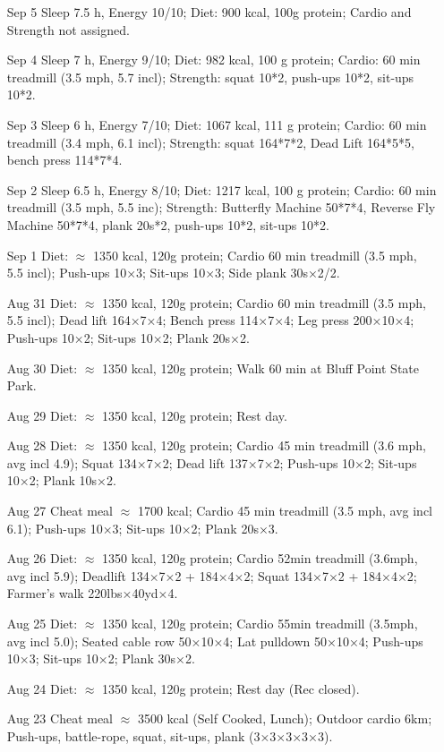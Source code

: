 \documentclass{article}
\begin{document}
\begin{itemize}
\item [Sep 5] Sleep 7.5 h, Energy 10/10; Diet:  900 kcal, 100g protein; Cardio and Strength not assigned.
\item [Sep 4] Sleep 7 h, Energy 9/10; Diet: 982 kcal, 100 g protein; Cardio: 60 min treadmill (3.5 mph, 5.7 incl); Strength: squat 10*2, push-ups 10*2, sit-ups 10*2.
\item [Sep 3] Sleep 6 h, Energy 7/10; Diet: 1067 kcal, 111 g protein; Cardio: 60 min treadmill (3.4 mph, 6.1 incl); Strength: squat 164*7*2, Dead Lift 164*5*5, bench press 114*7*4.
\item [Sep 2] Sleep 6.5 h, Energy 8/10; Diet: 1217 kcal, 100 g protein; Cardio: 60 min treadmill (3.5 mph, 5.5 inc); Strength: Butterfly Machine 50*7*4, Reverse Fly Machine 50*7*4, plank 20s*2, push-ups 10*2, sit-ups 10*2.
\item [Sep 1] Diet: $\approx$ 1350 kcal, 120g protein; Cardio 60 min treadmill (3.5 mph, 5.5 incl); Push-ups 10×3; Sit-ups 10×3; Side plank 30s×2/2.
\item [Aug 31] Diet: $\approx$ 1350 kcal, 120g protein; Cardio 60 min treadmill (3.5 mph, 5.5 incl); Dead lift 164×7×4; Bench press 114×7×4; Leg press 200×10×4; Push-ups 10×2; Sit-ups 10×2; Plank 20s×2.
\item [Aug 30] Diet: $\approx$ 1350 kcal, 120g protein; Walk 60 min at Bluff Point State Park.
\item [Aug 29] Diet: $\approx$ 1350 kcal, 120g protein; Rest day.
\item [Aug 28] Diet: $\approx$ 1350 kcal, 120g protein; Cardio 45 min treadmill (3.6 mph, avg incl 4.9); Squat 134×7×2; Dead lift 137×7×2; Push-ups 10×2; Sit-ups 10×2; Plank 10s×2.
\item [Aug 27] Cheat meal $\approx$ 1700 kcal; Cardio 45 min treadmill (3.5 mph, avg incl 6.1); Push-ups 10×3; Sit-ups 10×2; Plank 20s×3.
\item [Aug 26] Diet: $\approx$ 1350 kcal, 120g protein; Cardio 52min treadmill (3.6mph, avg incl 5.9); Deadlift 134×7×2 + 184×4×2; Squat 134×7×2 + 184×4×2; Farmer’s walk 220lbs×40yd×4.
\item [Aug 25] Diet: $\approx$ 1350 kcal, 120g protein; Cardio 55min treadmill (3.5mph, avg incl 5.0); Seated cable row 50×10×4; Lat pulldown 50×10×4; Push-ups 10×3; Sit-ups 10×2; Plank 30s×2.
\item [Aug 24] Diet: $\approx$ 1350 kcal, 120g protein; Rest day (Rec closed).
\item [Aug 23] Cheat meal $\approx$ 3500 kcal (Self Cooked, Lunch); Outdoor cardio 6km; Push-ups, battle-rope, squat, sit-ups, plank (3×3×3×3×3).

\end{itemize}
\end{document}
